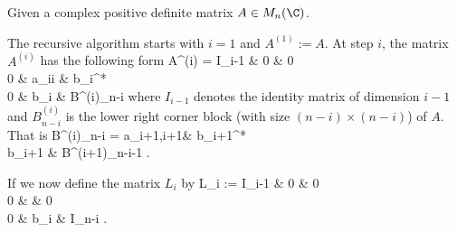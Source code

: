 

\begin{algorithm}
Given a complex positive definite matrix $A\in M_n(\C)$.

The recursive algorithm starts with $i =1$ and $A^{(1)} :=A$. At step $i$, the matrix $A^{(i)}$ has the following form
\be
A^{(i)} = \bepm
I_{i-1} & 0 & 0\\
0 & a_{ii} & b_i^* \\
0 & b_i & B^{(i)}_{n-i}
\eepm
\ee
where $I_{i-1}$ denotes the identity matrix of dimension $i-1$ and $B^{(i)}_{n-i}$ is the lower right corner block (with size $(n-i)\times (n-i)$) of $A$. That is
\be
B^{(i)}_{n-i} = \bepm
a_{i+1,i+1}& b_{i+1}^* \\
b_{i+1} & B^{(i+1)}_{n-i-1}
\eepm.
\ee

If we now define the matrix $L_i$ by
\be
L_i := \bepm
I_{i-1} & 0 & 0 \\
0 &  & 0 \\
0 & b_i & I_{n-i}
\eepm.
\ee


\end{algorithm}
